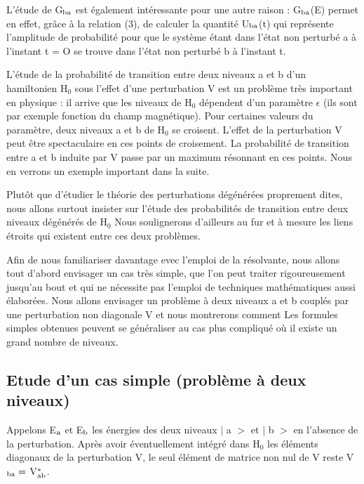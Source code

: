 L'étude de G$_{\text{ba}}$ est également intéressante pour une autre raison :
G$_{\text{ba}}$(E) permet en effet, grâce à la relation (3), de calculer la quantité
U$_{\text{ba}}$(t) qui représente l'amplitude de probabilité pour que le système étant
dans l'état non perturbé a à l'instant t = O se trouve dans l'état non perturbé b à l'instant t.

L'étude de la probabilité de transition entre deux niveaux a et b
d'un hamiltonien H$_0$ sous l'effet d'une perturbation V est un problème très
important en physique : il arrive que les niveaux de H$_0$ dépendent d'un paramètre $\epsilon$
(ils sont par exemple fonction du champ magnétique). Pour certaines
valeurs du paramètre, deux niveaux a et b de H$_0$ se croisent. L'effet de la
perturbation V peut être spectaculaire en ces points de croisement. La probabilité
de transition entre a et b induite par V passe par un maximum résonnant
en ces points. Nous en verrons un exemple important dans la suite.
\begin{center}
 \end{center}



Plutôt que d'étudier le théorie des perturbations dégénérées proprement dites,
nous allons surtout insister sur l'étude des probabilités de
transition entre deux niveaux dégénérés de H$_0$ Nous soulignerons d'ailleurs
au fur et à mesure les liens étroits qui existent entre ces deux problèmes.

Afin de nous familiariser davantage evec l'emploi de la résolvante,
nous allons tout d'abord envisager un cas très simple, que l'on peut traiter
rigoureusement jusqu'au bout et qui ne nécessite pas l'emploi de techniques
mathématiques aussi élaborées. Nous allons envisager un problème à deux niveaux
a et b couplés par une perturbation non diagonale V et nous montrerons
comment Les formules simples obtenues peuvent se généraliser au cas plus compliqué
où il existe un grand nombre de niveaux.
\subsection{Etude d'un cas simple (problème à deux niveaux)}%
Appelons E$_{\text{a}}$ et E$_{\text{b}}$ les énergies des deux niveaux $|$ a $>$ et $|$ b $>$ en
l'absence de la perturbation. Après avoir éventuellement intégré dans H$_0$ les
éléments diagonaux de la perturbation V, le seul élément de matrice non nul de
V reste V$_{\text{ba}}=$ V$_{\text{ab}}^*$.

